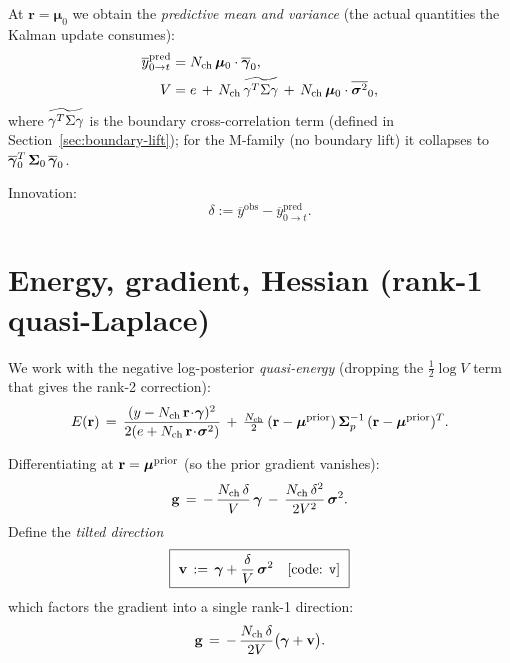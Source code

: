 \documentclass[11pt]{article}
\begin{document}
At $\mathbf{r} = \boldsymbol{\mu}_0$ we obtain the \emph{predictive mean and
variance} (the actual quantities the Kalman update consumes):
\begin{align}
  \overline{y}^{\mathrm{pred}}_{0\to t}
  &= N_{\mathrm{ch}}\,\boldsymbol{\mu}_0\cdot\overline{\boldsymbol{\gamma}}_0,\\
  V
  &= e \,+\, N_{\mathrm{ch}}\,\widetilde{\gamma^{T}\Sigma\gamma} \,+\, N_{\mathrm{ch}}\,\boldsymbol{\mu}_0\cdot\overline{\boldsymbol{\sigma}^2}_0,
  \label{eq:V}
\end{align}
where $\widetilde{\gamma^{T}\Sigma\gamma}$ is the boundary cross-correlation term (defined in
Section~\ref{sec:boundary-lift}); for the M-family (no boundary lift) it
collapses to $\overline{\boldsymbol{\gamma}}_0^{T}\,\boldsymbol{\Sigma}_0\,\overline{\boldsymbol{\gamma}}_0$.

Innovation:
\begin{equation}
  \delta := \overline{y}^{\mathrm{obs}} - \overline{y}^{\mathrm{pred}}_{0\to t}.
\end{equation}

\section{Energy, gradient, Hessian (rank-1 quasi-Laplace)}

We work with the negative log-posterior \emph{quasi-energy} (dropping the
$\tfrac12\log V$ term that gives the rank-2 correction):
\begin{equation}
  E(\mathbf{r})
  \,=\,
  \frac{(y - N_{\mathrm{ch}}\,\mathbf{r}\!\cdot\!\boldsymbol{\gamma})^2}
       {2(e + N_{\mathrm{ch}}\,\mathbf{r}\!\cdot\!\boldsymbol{\sigma}^2)}
  \,+\,
  \tfrac{N_{\mathrm{ch}}}{2}\,(\mathbf{r}-\boldsymbol{\mu}^{\mathrm{prior}})\,\boldsymbol{\Sigma}_p^{-1}\,(\mathbf{r}-\boldsymbol{\mu}^{\mathrm{prior}})^{T}.
\end{equation}

Differentiating at $\mathbf{r} = \boldsymbol{\mu}^{\mathrm{prior}}$ (so the prior gradient vanishes):
\begin{equation}
  \mathbf{g}
  \,=\,
  -\,\frac{N_{\mathrm{ch}}\,\delta}{V}\,\boldsymbol{\gamma}
  \,-\,
  \frac{N_{\mathrm{ch}}\,\delta^2}{2V^2}\,\boldsymbol{\sigma}^2.
  \label{eq:grad_explicit}
\end{equation}
Define the \emph{tilted direction}
\begin{equation}
  \boxed{\
  \mathbf{v} \,:=\, \boldsymbol{\gamma} + \frac{\delta}{V}\,\boldsymbol{\sigma}^2
  \quad\text{[code: \texttt{v}]}
  \ }
  \label{eq:vdef}
\end{equation}
which factors the gradient into a single rank-1 direction:
\begin{equation}
  \mathbf{g}
  \,=\,
  -\,\frac{N_{\mathrm{ch}}\,\delta}{2V}\bigl(\boldsymbol{\gamma} + \mathbf{v}\bigr).
  \label{eq:grad_factored}
\end{equation}
\end{document}
